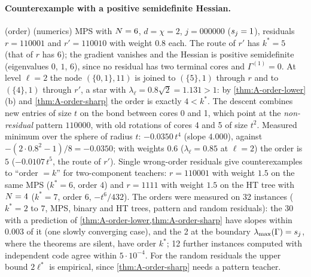 \paragraph{Counterexample with a positive semidefinite Hessian.} \proven{} (order) \empirical{} (numerics)
MPS with $N=6$, $d=\chi=2$, $j=000000$ ($s_{j}=1$), residuals $r=110001$ and $r'=110010$ with weight $0.8$
each. The route of $r'$ has $k^*=5$ (that of $r$ has $6$); the gradient vanishes and the Hessian is
positive semidefinite (eigenvalues $0$, $1$, $6$), since no residual has two terminal cores and
$\Gamma^{(1)}=0$. At level $\ell=2$ the node $(\{0,1\},11)$ is joined to $(\{5\},1)$ through $r$ and to
$(\{4\},1)$ through $r'$, a star with $\lambda_\ell=0.8\sqrt2=1.131>1$: by \cref{thm:A-order-lower}(b) and
\cref{thm:A-order-sharp} the order is exactly $4<k^*$. The descent combines new entries of size $t$ on the
bond between cores 0 and 1, which point at the \emph{non-residual} pattern $110000$, with old rotations of
cores 4 and 5 of size $t^2$. Measured minimum over the sphere of radius $t$: $-0.0350\,t^4$ (slope
$4.000$), against $-(2\cdot0.8^2-1)/8=-0.0350$; with weights $0.6$ ($\lambda_\ell=0.85$ at $\ell=2$) the order is $5$
($-0.0107\,t^5$, the route of $r'$). Single wrong-order residuals give counterexamples to ``order $=k$'' for
two-component teachers: $r=110001$ with weight $1.5$ on the same MPS ($k^*=6$, order $4$) and $r=1111$ with
weight $1.5$ on the HT tree with $N=4$ ($k^*=7$, order $6$, $-t^6/432$). The orders were measured on 32 instances
($k^*=2$ to $7$, MPS, binary and HT trees, pattern and random residuals): the 30 with a prediction of
\cref{thm:A-order-lower,thm:A-order-sharp} have slopes within $0.003$ of it (one slowly converging case), and the 2
at the boundary $\lambda_{\max}(\Gamma)=s_{j}$, where the theorems are silent, have order $k^*$; 12 further instances
computed with independent code agree within $5\cdot10^{-4}$. For the random residuals the upper bound $2\ell^*$ is
empirical, since \cref{thm:A-order-sharp} needs a pattern teacher.


